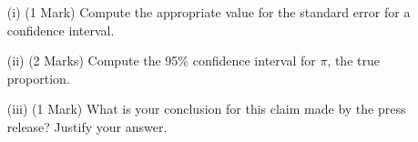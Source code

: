 \documentclass[]{article}
\begin{document}
\begin{itemize}



\begin{itemize}
\item[(i)] (1 Mark) Compute the appropriate value for the standard error for a confidence interval.
\item[(ii)] (2 Marks) Compute the 95\% confidence interval for $\pi$, the true proportion.
\item[(iii)] (1 Mark) What is your conclusion for this claim made by the press release? Justify your answer.
\end{itemize}
\end{itemize}
\end{document}
